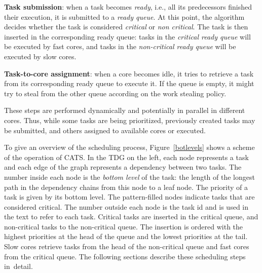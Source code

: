 \textbf{Task submission}: when a task becomes \textit{ready}, i.e., all its predecessors finished their execution, it is submitted to a \textit{ready queue}. At this point, the algorithm decides whether the task is considered \textit{critical} or \textit{non critical}. The task is then inserted in the corresponding ready queue: tasks in the \textit{critical ready queue} will be executed by fast cores, and tasks in the \textit{non-critical ready queue} will be executed by slow cores.

\textbf{Task-to-core assignment}: when a core becomes idle, it tries to retrieve a task from its corresponding ready queue to execute it. If the queue is empty, it might try to steal from the other queue according on the work stealing policy. %

These steps are performed dynamically and potentially in parallel in different cores. Thus, while some tasks are being prioritized, previously created tasks may be submitted, and others assigned to available cores or executed.

To give an overview of the scheduling process, Figure~\ref{botlevels} shows a scheme of the operation of CATS. In the TDG on the left, each node represents a task and each edge of the graph represents a dependency between two tasks. The number inside each node is the \textit{bottom level} of the task: the length of the longest path in the dependency chains from this node to a leaf node. The priority of a task is given by its bottom level. The pattern-filled nodes indicate tasks that are considered critical. The number outside each node is the task id and is used in the text to refer to each task. Critical tasks are inserted in the critical queue, and non-critical tasks to the non-critical queue. The insertion is ordered with the highest priorities at the head of the queue and the lowest priorities at the tail. Slow cores retrieve tasks from the head of the non-critical queue and fast cores from the critical queue. The following sections describe these scheduling steps in~detail.


